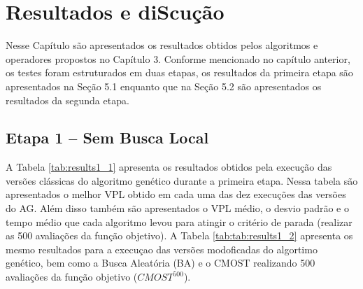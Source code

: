 \chapter{Resultados e diScução}
\label{ch:ch5}
Nesse Capítulo são apresentados os resultados obtidos pelos algoritmos e operadores propostos no Capítulo 3. Conforme mencionado no capítulo anterior, os testes foram estruturados em duas etapas, os resultados da primeira etapa são apresentados na Seção 5.1 enquanto que na Seção 5.2 são apresentados os resultados da segunda etapa.

\section{Etapa 1 – Sem Busca Local}

A Tabela \ref{tab:results1_1} apresenta os resultados obtidos pela execução das versões clássicas do algoritmo genético durante a primeira etapa. Nessa tabela são apresentados o melhor VPL obtido em cada uma das dez execuções das versões do AG. Além disso também são apresentados o VPL médio, o desvio padrão e o tempo médio que cada algoritmo levou para atingir o critério de parada (realizar as 500 avaliações da função objetivo). A Tabela \ref{tab:tab:results1_2} apresenta os mesmo resultados para a execuçao das versões modoficadas do algortimo genético, bem como a Busca Aleatória (BA) e o CMOST realizando 500 avaliações da função objetivo ($CMOST^{500}$).

